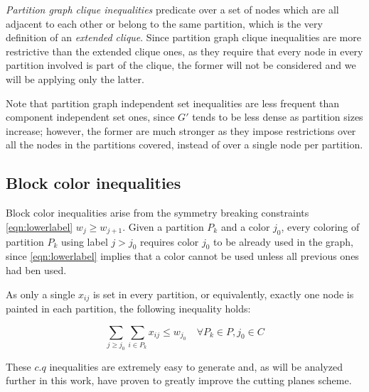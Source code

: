 \textit{Partition graph clique inequalities} predicate over a set of nodes which are all adjacent to each other or belong to the same partition, which is the very definition of an \textit{extended clique}. Since partition graph clique inequalities are more restrictive than the extended clique ones, as they require that every node in every partition involved is part of the clique, the former will not be considered and we will be applying only the latter.

Note that partition graph independent set inequalities are less frequent than component independent set ones, since $G'$ tends to be less dense as partition sizes increase; however, the former are much stronger as they impose restrictions over all the nodes in the partitions covered, instead of over a single node per partition.

\subsection{Block color inequalities}

Block color inequalities arise from the symmetry breaking constraints \ref{eqn:lowerlabel} $w_j \geq w_{j+1}$. Given a partition $P_k$ and a color $j_0$, every coloring of partition $P_k$ using label $j > j_0$ requires color $j_0$ to be already used in the graph, since \ref{eqn:lowerlabel} implies that a color cannot be used unless all previous ones had ben used. 

As only a single $x_{ij}$ is set in every partition, or equivalently, exactly one node is painted in each partition, the following inequality holds:

\begin{equation}
\label{ineq:blockcp}
\sum_{j \geq j_0} \sum_{i \in P_k} x_{ij} \leq w_{j_0} \quad \forall P_k \in P, j_0 \in C
\end{equation}

These $c.q$ inequalities are extremely easy to generate and, as will be analyzed further in this work, have proven to greatly improve the cutting planes scheme.
